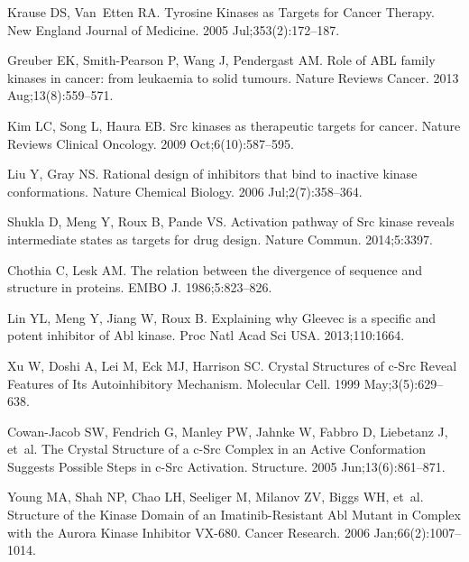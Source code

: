 \documentclass[10pt,letterpaper]{article}
\begin{document}
\begin{thebibliography}{100}
Krause DS, Van~Etten RA.
\newblock Tyrosine {Kinases} as {Targets} for {Cancer} {Therapy}.
\newblock New England Journal of Medicine. 2005 Jul;353(2):172--187.

Greuber EK, Smith-Pearson P, Wang J, Pendergast AM.
\newblock Role of {ABL} family kinases in cancer: from leukaemia to solid
  tumours.
\newblock Nature Reviews Cancer. 2013 Aug;13(8):559--571.

Kim LC, Song L, Haura EB.
\newblock Src kinases as therapeutic targets for cancer.
\newblock Nature Reviews Clinical Oncology. 2009 Oct;6(10):587--595.

Liu Y, Gray NS.
\newblock Rational design of inhibitors that bind to inactive kinase
  conformations.
\newblock Nature Chemical Biology. 2006 Jul;2(7):358--364.

Shukla D, Meng Y, Roux B, Pande VS.
\newblock Activation pathway of {Src} kinase reveals intermediate states as
  targets for drug design.
\newblock Nature Commun. 2014;5:3397.

Chothia C, Lesk AM.
\newblock The relation between the divergence of sequence and structure in
  proteins.
\newblock EMBO J. 1986;5:823--826.

Lin YL, Meng Y, Jiang W, Roux B.
\newblock Explaining why {Gleevec} is a specific and potent inhibitor of {Abl}
  kinase.
\newblock Proc Natl Acad Sci USA. 2013;110:1664.

Xu W, Doshi A, Lei M, Eck MJ, Harrison SC.
\newblock Crystal {Structures} of c-{Src} {Reveal} {Features} of {Its}
  {Autoinhibitory} {Mechanism}.
\newblock Molecular Cell. 1999 May;3(5):629--638.

Cowan-Jacob SW, Fendrich G, Manley PW, Jahnke W, Fabbro D, Liebetanz J, et~al.
\newblock The {Crystal} {Structure} of a c-{Src} {Complex} in an {Active}
  {Conformation} {Suggests} {Possible} {Steps} in c-{Src} {Activation}.
\newblock Structure. 2005 Jun;13(6):861--871.

Young MA, Shah NP, Chao LH, Seeliger M, Milanov ZV, Biggs WH, et~al.
\newblock Structure of the {Kinase} {Domain} of an {Imatinib}-{Resistant} {Abl}
  {Mutant} in {Complex} with the {Aurora} {Kinase} {Inhibitor} {VX}-680.
\newblock Cancer Research. 2006 Jan;66(2):1007--1014.


\end{thebibliography}
\end{document}
